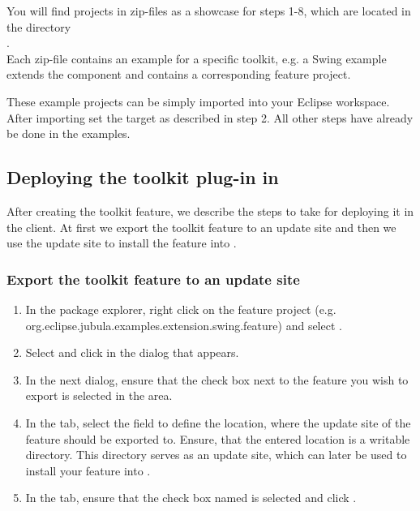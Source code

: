 You will find projects in zip-files as a showcase for steps 1-8, which are
located in the directory\\
.\\
Each zip-file contains an example for a specific toolkit, e.g. a Swing example
extends the component  and contains a corresponding feature
project.

These example projects can be simply imported into your Eclipse workspace. After
importing set the target as described in step 2. All other steps have
already be done in the examples.

\subsection{Deploying the toolkit plug-in in \app{}}

After creating the toolkit feature, we describe the steps to take for deploying
it in the \app{} client. At first we export the toolkit feature to an update
site and then we use the update site to install the feature into \app{}.
 
\subsubsection{Export the toolkit feature to an update site}

\begin{enumerate}
\item In the package explorer, right click on the feature project 
 (e.g. org.eclipse.jubula.examples.extension.swing.feature) and
 select .
\item Select  and click
 in the dialog that appears.
\item In the next dialog, ensure that the check box next to the feature you wish
to export is selected in the  area.
\item In the  tab, select the 
 field to define the location, where the update site of the feature should be
 exported to. Ensure, that the entered location is a writable directory. This
 directory serves as an update site, which can later be used to install your
 feature into \app{}.
\item In the  tab, ensure that the check box named
 is selected and click
.
\end{enumerate}

